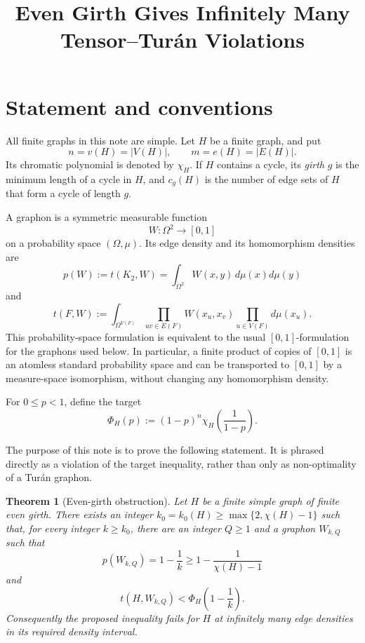 \documentclass[11pt]{article}
\title{Even Girth Gives Infinitely Many Tensor--Tur\'{a}n Violations}
\author{}
\date{}
\newtheorem{theorem}{Theorem}
\newcommand{\PhiH}{\Phi_H}
\begin{document}
\maketitle

\section{Statement and conventions}

All finite graphs in this note are simple.  Let \(H\) be a finite graph,
and put
\[
    n=v(H)=|V(H)|,
    \qquad
    m=e(H)=|E(H)|.
\]
Its chromatic polynomial is denoted by \(\chi_H\).  If \(H\) contains a
cycle, its \emph{girth} \(g\) is the minimum length of a cycle in \(H\),
and \(c_g(H)\) is the number of edge sets of \(H\) that form a cycle of
length \(g\).

A graphon is a symmetric measurable function
\[
    W\colon \Omega^2\longrightarrow[0,1]
\]
on a probability space \((\Omega,\mu)\).  Its edge density and its
homomorphism densities are
\[
    p(W):=t(K_2,W)=\int_{\Omega^2}W(x,y)\,d\mu(x)d\mu(y)
\]
and
\[
    t(F,W)
    :=
    \int_{\Omega^{V(F)}}
       \prod_{uv\in E(F)}W(x_u,x_v)
       \prod_{u\in V(F)}d\mu(x_u).
\]
This probability-space formulation is equivalent to the usual
\([0,1]\)-formulation for the graphons used below.  In particular, a
finite product of copies of \([0,1]\) is an atomless standard probability
space and can be transported to \([0,1]\) by a measure-space isomorphism,
without changing any homomorphism density.

For \(0\le p<1\), define the target
\[
    \PhiH(p)
    :=
    (1-p)^n
    \chi_H\!\left(\frac{1}{1-p}\right).
\]

The purpose of this note is to prove the following statement.  It is
phrased directly as a violation of the target inequality, rather than
only as non-optimality of a Tur\'{a}n graphon.

\begin{theorem}[Even-girth obstruction]\label{thm:main}
Let \(H\) be a finite simple graph of finite even girth.  There exists an
integer \(k_0=k_0(H)\ge \max\{2,\chi(H)-1\}\) such that, for every integer
\(k\ge k_0\), there are an integer \(Q\ge1\) and a graphon \(W_{k,Q}\)
such that
\[
    p(W_{k,Q})=1-\frac1k
    \ge
    1-\frac{1}{\chi(H)-1}
\]
and
\[
    t(H,W_{k,Q})
    <
    \PhiH\!\left(1-\frac1k\right).
\]
Consequently the proposed inequality fails for \(H\) at infinitely many
edge densities in its required density interval.
\end{theorem}
\end{document}

